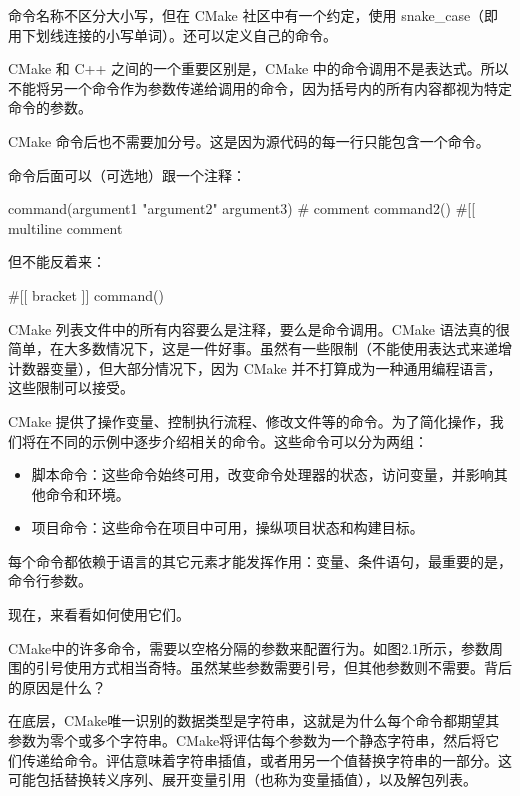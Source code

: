 
命令名称不区分大小写，但在 CMake 社区中有一个约定，使用 snake\_case（即用下划线连接的小写单词）。还可以定义自己的命令。

CMake 和 C++ 之间的一个重要区别是，CMake 中的命令调用不是表达式。所以不能将另一个命令作为参数传递给调用的命令，因为括号内的所有内容都视为特定命令的参数。

CMake 命令后也不需要加分号。这是因为源代码的每一行只能包含一个命令。

命令后面可以（可选地）跟一个注释：

\begin{cmake}
command(argument1 "argument2" argument3) # comment
command2() #[[ multiline comment
\end{cmake}

但不能反着来：

\begin{cmake}
#[[ bracket
]] command()
\end{cmake}

CMake 列表文件中的所有内容要么是注释，要么是命令调用。CMake 语法真的很简单，在大多数情况下，这是一件好事。虽然有一些限制（不能使用表达式来递增计数器变量），但大部分情况下，因为 CMake 并不打算成为一种通用编程语言，这些限制可以接受。

CMake 提供了操作变量、控制执行流程、修改文件等的命令。为了简化操作，我们将在不同的示例中逐步介绍相关的命令。这些命令可以分为两组：

\begin{itemize}
\item
脚本命令：这些命令始终可用，改变命令处理器的状态，访问变量，并影响其他命令和环境。

\item
项目命令：这些命令在项目中可用，操纵项目状态和构建目标。
\end{itemize}

每个命令都依赖于语言的其它元素才能发挥作用：变量、条件语句，最重要的是，命令行参数。

现在，来看看如何使用它们。


CMake中的许多命令，需要以空格分隔的参数来配置行为。如图2.1所示，参数周围的引号使用方式相当奇特。虽然某些参数需要引号，但其他参数则不需要。背后的原因是什么？

在底层，CMake唯一识别的数据类型是字符串，这就是为什么每个命令都期望其参数为零个或多个字符串。CMake将评估每个参数为一个静态字符串，然后将它们传递给命令。评估意味着字符串插值，或者用另一个值替换字符串的一部分。这可能包括替换转义序列、展开变量引用（也称为变量插值），以及解包列表。

